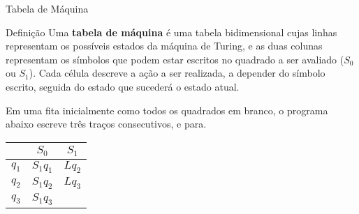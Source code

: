 \begin{frame}[fragile]{Tabela de Máquina}

    \begin{block}{Definição}
        Uma \textbf{tabela de máquina} é uma tabela bidimensional cujas linhas representam
        os possíveis estados da máquina de Turing, e as duas colunas representam os símbolos 
        que podem estar escritos no quadrado a ser avaliado ($S_0$ ou $S_1$). Cada célula 
        descreve a ação a ser realizada, a depender do símbolo escrito, seguida do estado que 
        sucederá o estado atual.
    \end{block}

    \vspace{0.1in}

    Em uma fita inicialmente como todos os quadrados em branco, o programa abaixo escreve
    três traços consecutivos, e para.

    \begin{table}[h]
        \centering

        \begin{tabular}{c|cc}
            & $S_0$ & $S_1$ \\
            \hline
            $q_1$ & $S_1q_1$ & $Lq_2$ \\
            $q_2$ & $S_1q_2$ & $Lq_3$ \\
            $q_3$ & $S_1q_3$ \\
        \end{tabular}
    \end{table}
\end{frame}

